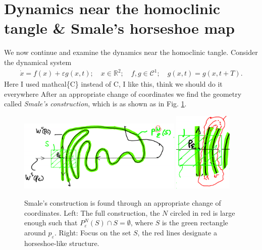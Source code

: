\section{Dynamics near the homoclinic tangle \& Smale's horseshoe map}
We now continue and examine the dynamics near the homoclinic tangle. Consider the dynamical system
\begin{align}
	\dot{x} = f(x) + \varepsilon g(x,t);\quad x \in \mathbb{R}^{2};\quad f,g \in  \mathcal{C}^{1};\quad g(x,t) = g(x,t+T).
\end{align}
{\color{blue} Here I used mathcal\{C\} instead of C, I like this, think we should do it everywhere}
After an appropriate change of coordinates we find the geometry called \emph{Smale's construction}, which is as shown as in Fig. \ref{fig:smales_construction}.
\begin{figure}[h!]
	\centering
	\includegraphics[width=0.7\textwidth]{figures/ch6/16smales_construction1.png}
	\hspace{0.03\textwidth}
	\includegraphics[width=0.25\textwidth]{figures/ch6/16smales_construction2.png}
	\caption{Smale's construction is found through an appropriate change of coordinates. Left: The full construction, the $N$ circled in red is large enough such that $P^{N}_{\varepsilon}(S)\cap S = \emptyset$, where $S$ is the green rectangle around $p_{\varepsilon}$. Right: Focus on the set $S$, the red lines designate a horseshoe-like structure.}
	\label{fig:smales_construction}
\end{figure}

